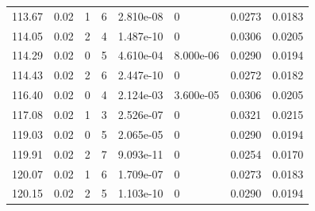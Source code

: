 \documentclass[preview]{standalone}
\begin{document}
{{{\begin{tabular}{L{1.2cm}C{1.2cm} C{0.3cm}C{0.5cm} C{1.4cm}C{1.4cm} C{1.4cm}C{1.4cm}}
  113.67  &  0.02  & 1     &  6 &  2.810e-08  & 0  & 0.0273 &  0.0183   \\ 
  114.05  &  0.02  & 2     &  4 &  1.487e-10  & 0  & 0.0306 &  0.0205   \\ 
  114.29  &  0.02  & 0     &  5 &  4.610e-04  & 8.000e-06  & 0.0290 &  0.0194   \\ 
  114.43  &  0.02  & 2     &  6 &  2.447e-10  & 0  & 0.0272 &  0.0182   \\ 
  116.40  &  0.02  & 0     &  4 &  2.124e-03  & 3.600e-05  & 0.0306 &  0.0205   \\ 
  117.08  &  0.02  & 1     &  3 &  2.526e-07  & 0  & 0.0321 &  0.0215   \\ 
  119.03  &  0.02  & 0     &  5 &  2.065e-05  & 0  & 0.0290 &  0.0194   \\ 
  119.91  &  0.02  & 2     &  7 &  9.093e-11  & 0  & 0.0254 &  0.0170   \\ 
  120.07  &  0.02  & 1     &  6 &  1.709e-07  & 0  & 0.0273 &  0.0183   \\ 
  120.15  &  0.02  & 2     &  5 &  1.103e-10  & 0  & 0.0290 &  0.0194   \\ 
\hline 
\end{tabular} 

}}}
\end{document}
